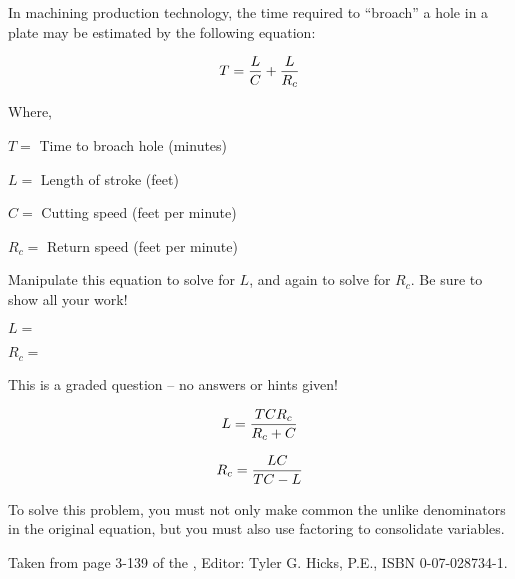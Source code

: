 

In machining production technology, the time required to ``broach'' a hole in a plate may be estimated by the following equation:

$$T = {L \over C} + {L \over R_c}$$

\noindent
Where,

$T =$ Time to broach hole (minutes)

$L =$ Length of stroke (feet)

$C =$ Cutting speed (feet per minute)

$R_c =$ Return speed (feet per minute)

\vskip 30pt

Manipulate this equation to solve for $L$, and again to solve for $R_c$.  Be sure to show all your work!

\vskip 50pt

$L = $

\vskip 100pt

$R_c = $


\vfil 

\eject






This is a graded question -- no answers or hints given!







$$L = {{T C R_c} \over {R_c + C}}$$

$$R_c = {{L C} \over {T C - L}}$$

\vskip 10pt

To solve this problem, you must not only make common the unlike denominators in the original equation, but you must also use factoring to consolidate variables.

\vskip 10pt

Taken from page 3-139 of the , Editor: Tyler G. Hicks, P.E., ISBN 0-07-028734-1.




